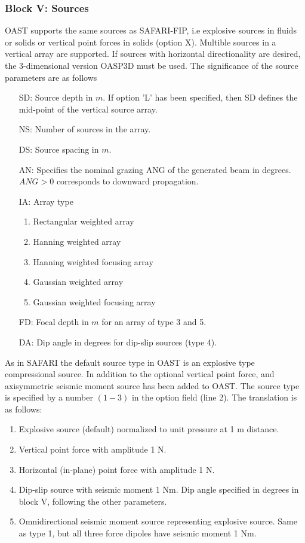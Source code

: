 \subsubsection{Block V: Sources}

    OAST supports the same sources as  SAFARI-FIP,  i.e 
explosive sources in fluids or solids or vertical point forces in 
solids  (option  X).  Multible sources in a  vertical  array  are 
supported. If sources with horizontal directionality are desired, 
the 3-dimensional version OASP3D must be used. The significance of the
source parameters are as follows
\begin{itemize}
		\item[SD:] Source depth in $m$. If option 'L' has been 
		specified, then SD defines the mid-point of the vertical 
		source array.
		\item[NS:]	Number of sources in the array.
		\item[DS:] Source spacing in $m$.
		\item[AN:]  Specifies the nominal grazing ANG of the 
		generated beam in degrees. $ANG>0$ corresponds to
		downward propagation.
		\item[IA:]	Array type
			\begin{enumerate}
	        	\item Rectangular weighted array
		 	\item Hanning weighted array
		 	\item Hanning weighted focusing array
			\item Gaussian weighted array
			\item Gaussian weighted focusing array
			\end{enumerate}
		\item[FD:] Focal depth in $m$ for an array of type 3 and 5.
       		\item[DA:] Dip angle in degrees for dip-slip sources (type 4).
		\end{itemize}


\label{oastsout}  

As in SAFARI the default source type in OAST 
is an explosive type compressional source. In addition to the optional
vertical point force, and axisymmetric seismic moment source has been
added to OAST. The source type is specified by a number $(1-3)$ in the
option field (line 2). The translation is as follows:
\begin{enumerate}
\item Explosive source (default) normalized to unit pressure at 1 m distance.
\item Vertical point force with amplitude 1 N.
\item Horizontal (in-plane) point force with amplitude 1 N.
\item Dip-slip source with seismic moment 1 Nm. Dip angle specified in 
      degrees in block V, following the other parameters.
\item Omnidirectional seismic moment source representing explosive source. Same as type 1, but all three force dipoles have seismic moment 1 Nm.
\end{enumerate}

